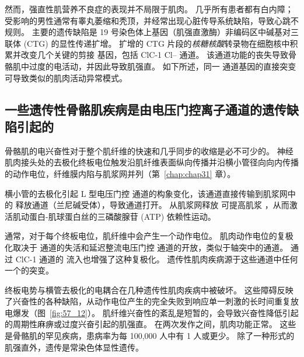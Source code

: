 然而，强直性肌营养不良症的表现并不局限于肌肉。
几乎所有患者都有白内障；
受影响的男性通常有睾丸萎缩和秃顶，并经常出现心脏传导系统缺陷，导致心跳不规则。
主要的遗传缺陷是 19 号染色体上基因（肌强直激酶）非编码区中碱基对三联体 (CTG) 的显性传递扩增。
扩增的 CTG 片段的\textit{核糖核酸}转录物在细胞核中积累并改变几个关键的剪接 基因，包括 ClC-1 Cl– 通道。
该通道功能的丧失导致骨骼肌中过度的电活动，并因此导致肌强直。
如下所述，同一  通道基因的直接突变可导致类似的肌肉活动异常模式。



\subsection{一些遗传性骨骼肌疾病是由电压门控离子通道的遗传缺陷引起的}

骨骼肌的电兴奋性对于整个肌纤维的快速和几乎同步的收缩是必不可少的。
神经肌肉接头处的去极化终板电位触发沿肌纤维表面纵向传播并沿横小管径向向内传播的动作电位，纤维膜内陷与肌浆网并列（第~\ref{chap:chap31} 章）。


横小管的去极化引起 L 型电压门控  通道的构象变化，该通道直接传输到肌浆网中的  释放通道（兰尼碱受体），导致通道打开。
从肌浆网释放  可提高肌浆 ，从而激活肌动蛋白-肌球蛋白丝的三磷酸腺苷 (ATP) 依赖性运动。


通常，对于每个终板电位，肌纤维中会产生一个动作电位。
肌肉动作电位的复极化取决于  通道的失活和延迟整流电压门控  通道的开放，类似于轴突中的通道。
通过 ClC-1  通道的  流入也增强了这种复极化。
遗传性肌肉疾病源于这些通道中任何一个的突变。


终板电势与横管去极化的电耦合在几种遗传性肌肉疾病中被破坏。
这些障碍反映了兴奋性的各种缺陷，从动作电位产生的完全失败到响应单一刺激的长时间重复放电爆发（图~\ref{fig:57_12}）。
肌纤维兴奋性的紊乱是短暂的，会导致兴奋性降低引起的周期性麻痹或过度兴奋引起的肌强直。
在两次发作之间，肌肉功能正常。
这些是骨骼肌的罕见疾病，患病率为每 100,000 人中有 1 人或更少。
除了一种形式的肌强直外，遗传是常染色体显性遗传。


